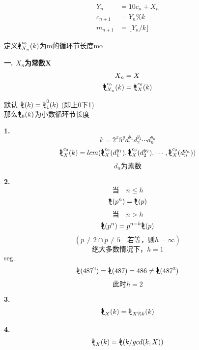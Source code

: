 \documentclass[16pt]{article}
\newcommand{\mo}{
	\mathord{
		\tikz[scale=0.31,baseline=1.3pt]{
			\draw[thick]  (0,0.188)--(0,1.1);
			\draw[thick] (0,0.205)arc(180:318.2:0.203);
			\draw[thick] (-0.2,0.82)--(0.11,0.82);
			\draw[thick] (0.1,0.82)arc(90:-90:0.1);
			\draw[thick] (0.1,0.62)--(-0.15,0.62);
			\draw[thick] (0.1,0.62)arc(90:-90:0.1);
			\draw[thick] (0.11,0.42)--(-0.2,0.42);
		}
	}
}
\begin{document}
	\setlength{\abovedisplayskip}{0pt}
	\setlength{\belowdisplayskip}{0pt}
	\setlength{\abovedisplayshortskip}{0pt}
	\setlength{\belowdisplayshortskip}{0pt}
	\begin{align*}
		Y_n &= 10c_n + X_n\\
		c_{n+1} &= Y_n \% k\\
		m_{n+1} &= \lfloor Y_n / k \rfloor
	\end{align*}
	\begin{center}
		定义$\mo^{c_0}_{X_n}(k)$为m的循环节长度mo\\
	\end{center}
	
	\vspace{4em}
	\textbf{一. $X_n$为常数X}
	\begin{align*}
		X_n &= X\\
		\mo^{c_0}_{X_n}(k) &= \mo^{c_0}_{X}(k)
	\end{align*}
	\begin{center}
		默认 $\mo(k) = \mo^0_1(k)$  \hspace{1em} (即上0下1)\\
		那么$\mo_{9}(k)$为小数循环节长度
	\end{center}
	
	\vspace{16pt}
	\textbf{1.}
	\vspace{-16pt}
	\[ k = 2^{x}5^{y}d_1^{y_1}d_2^{y_2} \cdots d_n^{y_n} \] 
	\[ \mo^{c_0}_{X}(k) = lcm(\mo^{c_0}_{X}(d_1^{y_1}), \mo^{c_0}_{X}(d_2^{y_2}),\cdots,\mo^{c_0}_{X}(d_n^{y_n})) \]
	\[ d_n\text{为素数}\]
	
	\vspace{16pt}
	\textbf{2.}
	\vspace{-16pt}
	\[ \text{当} \hspace{1em} n \leq h \]
	\[ \mo(p^n) = \mo(p) \]
	\[ \text{当} \hspace{1em} n > h \] 
	\[ \mo(p^n) = p^{n-h}\mo(p) \]
	\[ (p\neq2 \cap p\neq5 \hspace{1em} \text{若等，则$h=\infty$}) \]
	\[ \text{绝大多数情况下，}h=1 \]
	\hspace{4em}seg.
	\vspace{-16pt}
	\[ \mo(487^2) = \mo(487) = 486 \neq \mo(487^3) \] 
	\[ \text{此时} h=2 \]
	
	\vspace{16pt}
	\textbf{3.}
	\vspace{-16pt}
	\[ \mo_X(k) = \mo_{X\%k}(k) \]
	
	\vspace{16pt}
	\textbf{4.}
	\vspace{-16pt}
	\[ \mo_X(k) = \mo(k/gcd(k,X)) \]
	
\end{document}
